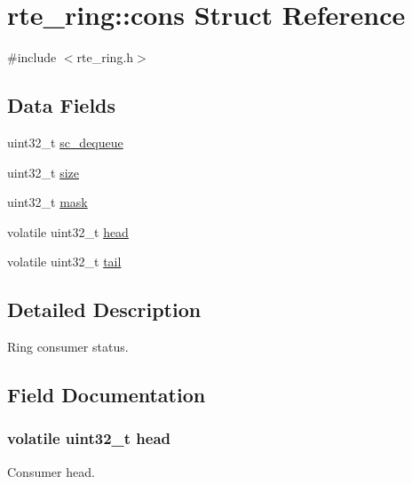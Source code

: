 \hypertarget{structrte__ring_1_1cons}{}\section{rte\+\_\+ring\+:\+:cons Struct Reference}
\label{structrte__ring_1_1cons}


{\ttfamily \#include $<$rte\+\_\+ring.\+h$>$}

\subsection*{Data Fields}
\begin{DoxyCompactItemize}
\item 
uint32\+\_\+t \hyperlink{structrte__ring_1_1cons_af26638b0c5eea5e1e3f58305293a1c51}{sc\+\_\+dequeue}
\item 
uint32\+\_\+t \hyperlink{structrte__ring_1_1cons_ab2c6b258f02add8fdf4cfc7c371dd772}{size}
\item 
uint32\+\_\+t \hyperlink{structrte__ring_1_1cons_ad3bee21df6875eeccd25d3c577e0600a}{mask}
\item 
volatile uint32\+\_\+t \hyperlink{structrte__ring_1_1cons_a5f4413ef4a8b1d82ffcfce4265fde558}{head}
\item 
volatile uint32\+\_\+t \hyperlink{structrte__ring_1_1cons_ac053cdb6967e8901ed4c87327d649bf7}{tail}
\end{DoxyCompactItemize}


\subsection{Detailed Description}
Ring consumer status. 

\subsection{Field Documentation}
\hypertarget{structrte__ring_1_1cons_a5f4413ef4a8b1d82ffcfce4265fde558}{}
\subsubsection[{head}]{\setlength{\rightskip}{0pt plus 5cm}volatile uint32\+\_\+t head}\label{structrte__ring_1_1cons_a5f4413ef4a8b1d82ffcfce4265fde558}
Consumer head. \hypertarget{structrte__ring_1_1cons_ad3bee21df6875eeccd25d3c577e0600a}{}
